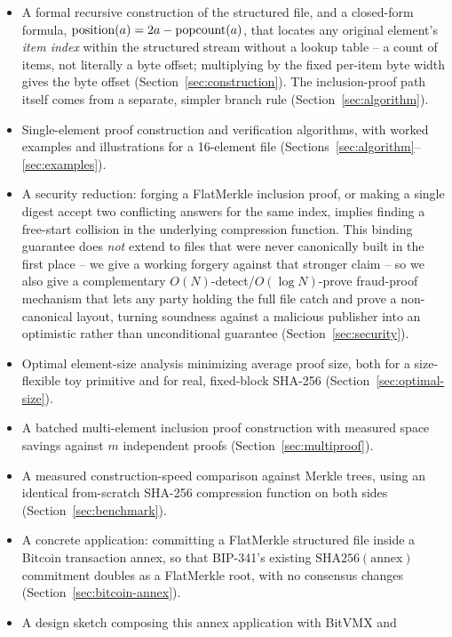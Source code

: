 \begin{itemize}
\item A formal recursive construction of the structured file, and a
  closed-form formula, $\mathrm{position}(a) = 2a - \mathrm{popcount}(a)$, that
  locates any original element's \emph{item index} within the structured
  stream without a lookup table -- a count of items, not literally a byte
  offset; multiplying by the fixed per-item byte width gives the byte
  offset (Section~\ref{sec:construction}). The inclusion-proof path itself
  comes from a separate, simpler branch rule (Section~\ref{sec:algorithm}).
\item Single-element proof construction and verification algorithms, with
  worked examples and illustrations for a 16-element file
  (Sections~\ref{sec:algorithm}--\ref{sec:examples}).
\item A security reduction: forging a FlatMerkle inclusion proof, or making
  a single digest accept two conflicting answers for the same index,
  implies finding a free-start collision in the underlying compression
  function. This binding guarantee does \emph{not} extend to files that
  were never canonically built in the first place -- we give a working
  forgery against that stronger claim -- so we also give a complementary
  $O(N)$-detect/$O(\log N)$-prove fraud-proof mechanism that lets any party
  holding the full file catch and prove a non-canonical layout, turning
  soundness against a malicious publisher into an optimistic rather than
  unconditional guarantee (Section~\ref{sec:security}).
\item Optimal element-size analysis minimizing average proof size, both for
  a size-flexible toy primitive and for real, fixed-block SHA-256
  (Section~\ref{sec:optimal-size}).
\item A batched multi-element inclusion proof construction with measured
  space savings against $m$ independent proofs (Section~\ref{sec:multiproof}).
\item A measured construction-speed comparison against Merkle trees, using
  an identical from-scratch SHA-256 compression function on both sides
  (Section~\ref{sec:benchmark}).
\item A concrete application: committing a FlatMerkle structured file inside
  a Bitcoin transaction annex, so that BIP-341's existing
  $\mathrm{SHA256}(\text{annex})$ commitment doubles as a FlatMerkle root,
  with no consensus changes (Section~\ref{sec:bitcoin-annex}).
\item A design sketch composing this annex application with BitVMX and

\end{itemize}
